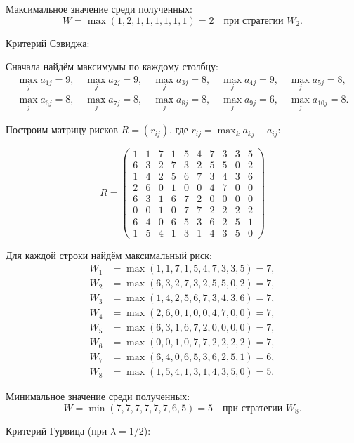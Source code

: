 Максимальное значение среди полученных:
\[
W = \max(1,2,1,1,1,1,1,1) = 2 \quad \text{при стратегии } W_2.
\]

Критерий Сэвиджа:

Сначала найдём максимумы по каждому столбцу:
\[
\begin{gathered}
\max_j a_{1j} = 9, \quad \max_j a_{2j} = 9, \quad \max_j a_{3j} = 8, \quad \max_j a_{4j} = 9, \quad \max_j a_{5j} = 8, \\
\max_j a_{6j} = 8, \quad \max_j a_{7j} = 8, \quad \max_j a_{8j} = 8, \quad \max_j a_{9j} = 6, \quad \max_j a_{10j} = 8.
\end{gathered}
\]

Построим матрицу рисков $R = (r_{ij})$, где $r_{ij} = \max_k a_{kj} - a_{ij}$:

\[
R = \begin{pmatrix}
1 & 1 & 7 & 1 & 5 & 4 & 7 & 3 & 3 & 5 \\
6 & 3 & 2 & 7 & 3 & 2 & 5 & 5 & 0 & 2 \\
1 & 4 & 2 & 5 & 6 & 7 & 3 & 4 & 3 & 6 \\
2 & 6 & 0 & 1 & 0 & 0 & 4 & 7 & 0 & 0 \\
6 & 3 & 1 & 6 & 7 & 2 & 0 & 0 & 0 & 0 \\
0 & 0 & 1 & 0 & 7 & 7 & 2 & 2 & 2 & 2 \\
6 & 4 & 0 & 6 & 5 & 3 & 6 & 2 & 5 & 1 \\
1 & 5 & 4 & 1 & 3 & 1 & 4 & 3 & 5 & 0
\end{pmatrix}
\]

Для каждой строки найдём максимальный риск:
\begin{align*}
W_1 &= \max(1,1,7,1,5,4,7,3,3,5) = 7, \\
W_2 &= \max(6,3,2,7,3,2,5,5,0,2) = 7, \\
W_3 &= \max(1,4,2,5,6,7,3,4,3,6) = 7, \\
W_4 &= \max(2,6,0,1,0,0,4,7,0,0) = 7, \\
W_5 &= \max(6,3,1,6,7,2,0,0,0,0) = 7, \\
W_6 &= \max(0,0,1,0,7,7,2,2,2,2) = 7, \\
W_7 &= \max(6,4,0,6,5,3,6,2,5,1) = 6, \\
W_8 &= \max(1,5,4,1,3,1,4,3,5,0) = 5.
\end{align*}

Минимальное значение среди полученных:
\[
W = \min(7,7,7,7,7,7,6,5) = 5 \quad \text{при стратегии } W_8.
\]

Критерий Гурвица (при $\lambda = 1/2$):

